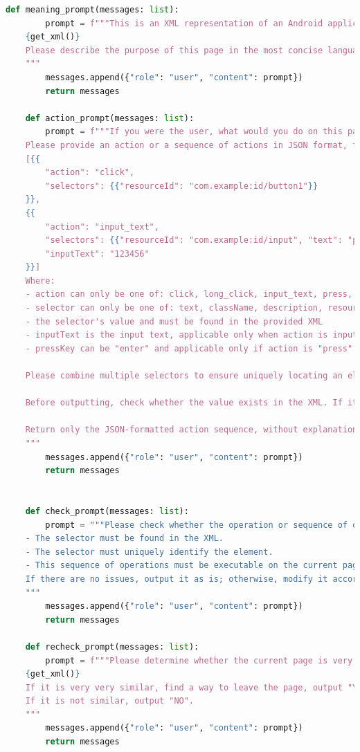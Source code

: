 \documentclass{article}
\begin{document}
\begin{lstlisting}[language=Python]
    def meaning_prompt(messages: list):
        prompt = f"""This is an XML representation of an Android application page:
    {get_xml()}
    Please describe the purpose of this page in the most concise language possible.
    """
        messages.append({"role": "user", "content": prompt})
        return messages
    
    def action_prompt(messages: list):
        prompt = f"""If you were the user, what would you do on this page?
    Please provide an action or a sequence of actions in JSON format, for example:
    [{{
        "action": "click",
        "selectors": {{"resourceId": "com.example:id/button1"}}
    }},
    {{
        "action": "input_text",
        "selectors": {{"resourceId": "com.example:id/input", "text": "password"}}
        "inputText": "123456"
    }}]
    Where:
    - action can only be one of: click, long_click, input_text, press, swipe, scroll
    - selector can only be one of: text, className, description, resourceId (must be in camelCase); choose the selector that uniquely identifies the element
    - the selector's value and must be found in the provided XML
    - inputText is the input text, applicable only when action is input_text
    - pressKey can be "enter" and applicable only if action is "press"
    
    Please combine multiple selectors to ensure uniquely locating an element.
    
    Before outputting, check whether the value exists in the XML. If it does not exist, modify the action accordingly.
    
    Return only the JSON-formatted action sequence, without explanations or code blocks.
    """
        messages.append({"role": "user", "content": prompt})
        return messages
    
    
    def check_prompt(messages: list):
        prompt = """Please check whether the operation or sequence of operations you just generated meets the requirements:
    - The selector must be found in the XML.
    - The selector must uniquely identify the element.
    - This sequence of operations must be executable on the current page.
    If there are no issues, output it as is; otherwise, modify it accordingly.
    """
        messages.append({"role": "user", "content": prompt})
        return messages
    
    def recheck_prompt(messages: list):
        prompt = f"""Please determine whether the current page is very very similar to the previously displayed XML page.
    {get_xml()}
    If it is very very similar, find a way to leave the page, output "YES", and then output the operation sequence according to the previous rules.
    If it is not similar, output "NO".
    """
        messages.append({"role": "user", "content": prompt})
        return messages
    


\end{lstlisting}
\end{document}
